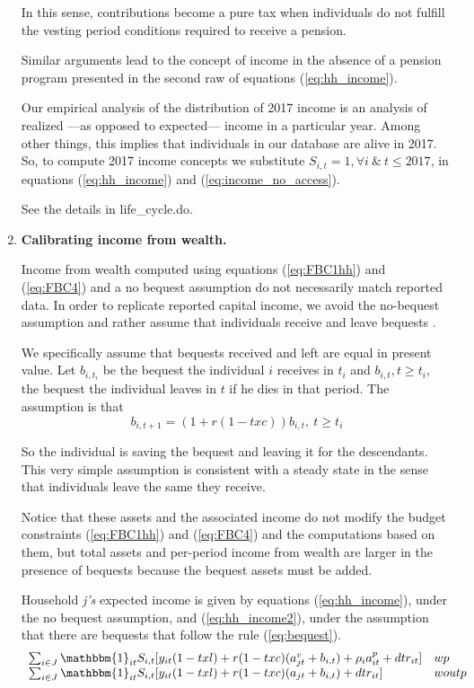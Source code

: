 \documentclass{article}
\begin{document}
\begin{enumerate}
In this sense, contributions become a pure tax when individuals do not fulfill the vesting period conditions required to receive a pension. 

Similar arguments lead to the concept of income in the absence of a pension program presented in the second raw of equations (\ref{eq:hh_income}). 

Our empirical analysis of the distribution of 2017 income is an analysis of realized ---as opposed to expected--- income in a particular year. Among other things, this implies that individuals in our database are alive in 2017. So, to compute 2017 income concepts we substitute $S_{i,t}=1, \forall i \ \& \ t\leq 2017$,  in equations (\ref{eq:hh_income}) and (\ref{eq:income_no_access}).

See the details in life\_cycle.do.

\item \textbf{Calibrating income from wealth.} \label{item:bequests}

Income from wealth computed using equations (\ref{eq:FBC1hh}) and (\ref{eq:FBC4}) and a no bequest assumption do not necessarily match reported data. In order to replicate reported capital income, we avoid the no-bequest assumption and rather assume that individuals receive and leave bequests \parencite[for a similar argument, see among others][]{Fullerton1991, Kotlikoff1981}.  

We specifically assume that bequests received and left are equal in present value.   Let $b_{i,t_i}$ be the bequest the individual $i$ receives in $t_i$ and $b_{i,t}, t \geq t_i,$ the bequest the individual leaves in $t$ if he dies in that period. The assumption is that 
\begin{equation}  \label{eq:bequest}
    b_{i,t+1}=(1+r(1-txc))b_{i,t} , \ t \geq t_i
\end{equation}

So the individual is saving the bequest and leaving it for the descendants. This very simple assumption is consistent with a steady state in the sense that individuals leave the same they receive. 

Notice that these assets and the associated income do not modify the budget constraints (\ref{eq:FBC1hh}) and (\ref{eq:FBC4}) and the computations based on them, but total assets and per-period income from wealth are larger in the presence of bequests because the bequest assets must be added. 

Household \textit{j's} expected income is given by equations (\ref{eq:hh_income}), under the no bequest assumption, and (\ref{eq:hh_income2}), under the assumption that there are bequests that follow the rule (\ref{eq:bequest}).       
\begin{equation} \label{eq:hh_income2}
    \begin{array}{ll}
        \sum_{i\in J} \mathbbm{1}_{it}S_{i,t} [y_{it}(1-txl)+r(1-txc) (a_{jt}^v +b_{i,t})+ \rho_i a_{it}^p +dtr_{it} ]  & wp  \\
         \sum_{i\in J} \mathbbm{1}_{it}S_{i,t}[y_{it}(1-txl) +r(1-txc) (a_{jt}+b_{i,t}) +dtr_{it}] &  woutp
    \end{array}
\end{equation}


\end{enumerate}
\end{document}
